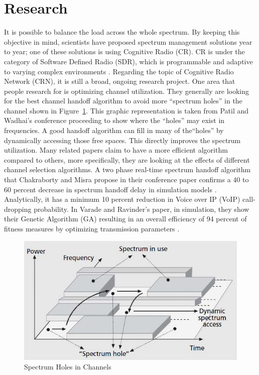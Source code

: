 \section{Research}
It is possible to balance the load across the whole spectrum. By keeping this objective in mind, scientists have proposed spectrum 
management solutions year to year; one of these solutions is using Cognitive Radio (CR). CR is under the category of Software Defined Radio 
(SDR), which is programmable and adaptive to varying complex environments \cite{software_defined_radio}. Regarding the topic of Cognitive Radio Network (CRN), it is still a broad, ongoing research project. One area that people research for is optimizing channel utilization. They generally are looking for the best channel handoff algorithm to avoid more ``spectrum holes'' in the channel shown in Figure~\ref{fig:channel_hole}. This graphic representation is taken from Patil and Wadhai's conference proceeding to show where the ``holes'' may exist in frequencies. A good handoff algorithm can fill in many of the``holes'' by dynamically accessing those free spaces. This directly improves the spectrum utilization. Many related papers claim to have a 
more efficient algorithm compared to others, more specifically, they are looking at the effects of different channel 
selection algorithms. A two phase real-time spectrum handoff algorithm that Chakraborty and Misra propose in their conference paper confirms a 40 to 60 percent decrease in spectrum handoff delay in simulation models \cite{real_time_spectrum}. Analytically, it has a minimum 10 percent reduction in Voice over IP (VoIP) call-dropping probability. In Varade and Ravinder's paper, in simulation, they show their Genetic Algorithm (GA) resulting in an overall efficiency of 94 percent of fitness measures by optimizing transmission parameters \cite{optimal_spectrum_allocation}.


\begin{figure}[ht]
\centering
\includegraphics[width=12cm]{figures/spectrum_hole_concept.png}
\caption{Spectrum Holes in Channels \cite{spectrum_hole}}
\label{fig:channel_hole}
\end{figure}

